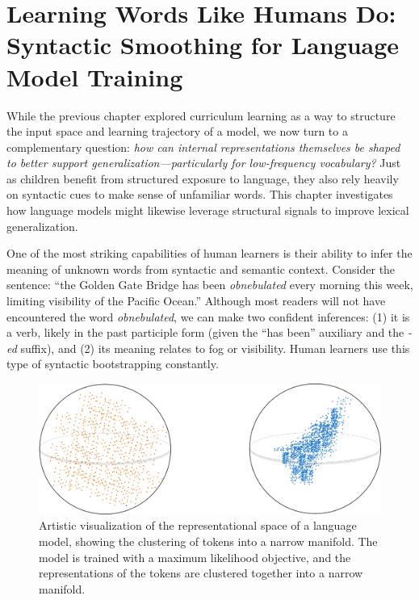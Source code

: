 \chapter{Learning Words Like Humans Do: Syntactic Smoothing for Language Model Training}

While the previous chapter explored curriculum learning as a way to structure the input space and learning trajectory of a model, we now turn to a complementary question: \emph{how can internal representations themselves be shaped to better support generalization—particularly for low-frequency vocabulary?} Just as children benefit from structured exposure to language, they also rely heavily on syntactic cues to make sense of unfamiliar words. This chapter investigates how language models might likewise leverage structural signals to improve lexical generalization.

One of the most striking capabilities of human learners is their ability to infer the meaning of unknown words from syntactic and semantic context. Consider the sentence: ``the Golden Gate Bridge has been \emph{obnebulated} every morning this week, limiting visibility of the Pacific Ocean.'' Although most readers will not have encountered the word \textit{obnebulated}, we can make two confident inferences: (1) it is a verb, likely in the past participle form (given the ``has been'' auxiliary and the \textit{-ed} suffix), and (2) its meaning relates to fog or visibility. Human learners use this type of syntactic bootstrapping constantly.

\begin{figure}[ht!]
    \centering
    \includegraphics[width=0.8\linewidth]{chapters/syntatic-smoothing/figures/anisotropy_visualization.pdf}
    \caption{Artistic visualization of the representational space of a language model, showing the clustering of tokens into a narrow manifold. The model is trained with a maximum likelihood objective, and the representations of the tokens are clustered together into a narrow manifold.}
    \label{fig:anisotropy_visualization}
\end{figure}

